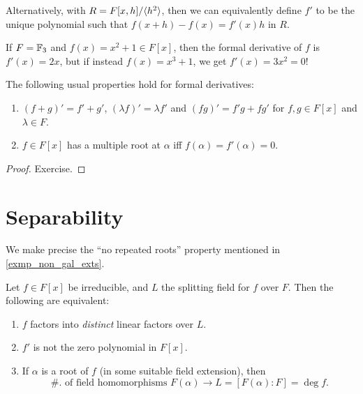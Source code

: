 \begin{remark}
    Alternatively, with $R = F[x, h]/\langle {h^2} \rangle$, then we can equivalently define $f'$ to be the unique polynomial such that $f(x + h) - f(x) = f'(x)h$ in $R$.
\end{remark}

\begin{example}
    If $F = \mathbb{{F}}_3$ and $f(x) = x^2 + 1 \in F[x]$, then the formal derivative of $f$ is $f'(x) = 2x$, but if instead $f(x) = x^3 + 1$, we get $f'(x) = 3x^2 = 0$!
\end{example}

\begin{proposition}
\label{prop_derivative}
    The following usual properties hold for formal derivatives:
    \begin{enumerate}[label=(\alph*)]
        \item $(f + g)' = f' + g'$, $(\lambda f)' = \lambda f'$ and $(fg)' = f'g + fg'$ for $f, g \in F[x]$ and $\lambda \in F$.
        \item $f \in F[x]$ has a multiple root at $\alpha$ iff $f(\alpha) = f'(\alpha) = 0$.
    \end{enumerate}
\end{proposition}

\begin{proof}
    Exercise.
\end{proof}

\section{Separability}

We make precise the ``no repeated roots'' property mentioned in \cref{exmp_non_gal_exts}.

\begin{proposition}
\label{prop_separability_conditions}
    Let $f \in F[x]$ be irreducible, and $L$ the splitting field for $f$ over $F$. Then the following are equivalent:
    \begin{enumerate}[label=(\alph*)]
        \item $f$ factors into \emph{distinct} linear factors over $L$.
        \item $f'$ is not the zero polynomial in $F[x]$.
        \item If $\alpha$ is a root of $f$ (in some suitable field extension), then
        \[
            \#. \text{ of field homomorphisms } F(\alpha) \to L = [F(\alpha) : F] = \deg{f}.
        \]
    \end{enumerate}
\end{proposition}

